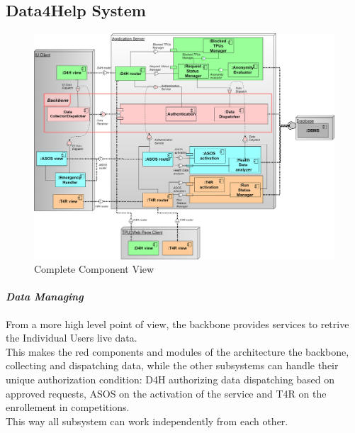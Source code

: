\subsection{Data4Help System}
\begin{figure}[H]
\label{fig:ComponentDiagram}
\caption{Complete Component View}
\centering
\includegraphics[width = \textwidth]{sections/architecturalDesign/ComponentDiagram.png}
\end{figure}
\paragraph{\textit{Data Managing}} From a more high level point of view, the backbone provides services to retrive the Individual Users live data. \\
This makes the red components and modules of the architecture the backbone, collecting and dispatching data, while the other subsystems can handle their unique authorization condition: D4H authorizing data dispatching based on approved requests, ASOS on the activation of the service and T4R on the enrollement in competitions. \\
This way all subsystem can work independently from each other.%
